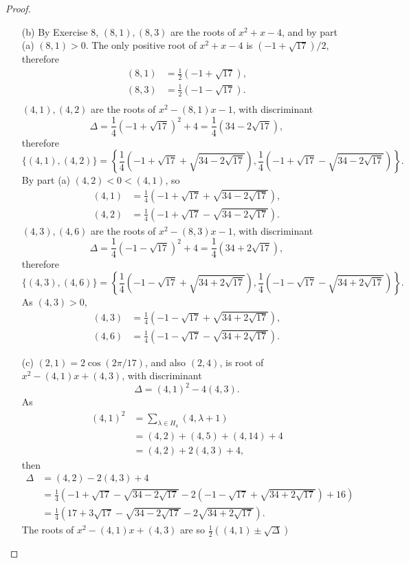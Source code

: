 \documentclass[11pt,a4paper]{article}
\begin{document}
\begin{proof}
\begin{enumerate}
\item[(b)]
By Exercise 8, $(8,1),(8,3)$ are the roots of $x^2+x-4$, and by part (a) $(8,1)>0$. The only positive root of $x^2+x-4$ is $(-1+\sqrt{17})/2$, therefore
\begin{align*}
(8,1) &= \frac{1}{2}\left(-1+\sqrt{17}\right),\\
(8,3) &= \frac{1}{2}\left(-1-\sqrt{17}\right).\\
\end{align*}
$(4,1),(4,2)$ are the roots of $x^2-(8,1)x-1$, with discriminant $$\Delta= \frac{1}{4}(-1+\sqrt{17})^2+4 = \frac{1}{4}(34 - 2\sqrt{17}),$$ therefore
$$\{(4,1),(4,2)\} =\left \{\frac{1}{4} \left(-1+\sqrt{17} +\sqrt{34-2\sqrt{17}}\right), \frac{1}{4} \left(-1+\sqrt{17} -\sqrt{34-2\sqrt{17}}\right)\right\}.$$
By part (a) $(4,2)<0<(4,1)$, so
\begin{align*}
(4,1) &= \frac{1}{4} \left(-1+\sqrt{17} +\sqrt{34-2\sqrt{17}}\right),\\
(4,2)&= \frac{1}{4} \left(-1+\sqrt{17} - \sqrt{34-2\sqrt{17}}\right).
\end{align*}
$(4,3),(4,6)$ are the roots of $x^2-(8,3)x-1$, with discriminant $$\Delta= \frac{1}{4}(-1-\sqrt{17})^2+4 = \frac{1}{4}(34 + 2\sqrt{17}),$$ therefore
$$\{(4,3),(4,6)\} =\left \{\frac{1}{4} \left(-1-\sqrt{17} +\sqrt{34+2\sqrt{17}}\right), \frac{1}{4} \left(-1-\sqrt{17} -\sqrt{34+2\sqrt{17}}\right)\right\}.$$
As $(4,3)>0$,
\begin{align*}
(4,3) &= \frac{1}{4} \left(-1-\sqrt{17} +\sqrt{34+2\sqrt{17}}\right),\\
(4,6) &=\frac{1}{4} \left(-1-\sqrt{17} -\sqrt{34+2\sqrt{17}}\right).
\end{align*}


\item[(c)]
$(2,1) = 2\cos(2\pi/17)$, and also $(2,4)$, is root of $x^2 -(4,1)x+(4,3)$, with discriminant $$\Delta = (4,1)^2 - 4(4,3).$$
As
\begin{align*}
(4,1)^2 &= \sum\limits_{\lambda \in H_4} (4,\lambda+1)\\
&=(4,2)+(4,5)+(4,14)+4\\
&=(4,2)+2(4,3)+ 4,
\end{align*}
then 
\begin{align*}
\Delta &= (4,2) -2(4,3) + 4\\
&= \frac{1}{4} \left (  -1+\sqrt{17}- \sqrt{34-2\sqrt{17}} -2\left(-1-\sqrt{17} +\sqrt{34+2\sqrt{17}}\right) +16\right)\\
&= \frac{1}{4} \left ( 17 + 3\sqrt{17} - \sqrt{34-2\sqrt{17}}  -2 \sqrt{34+2\sqrt{17}} \right).
\end{align*}
The roots of $x^2 -(4,1)x+(4,3)$ are so
$\frac{1}{2}((4,1)\pm \sqrt{\Delta})$


\end{enumerate}
\end{proof}
\end{document}
